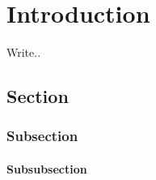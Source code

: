 \documentclass[../HWThesis.tex]{subfiles}
\begin{document}
\chapter{Introduction}
\label{ch:introduction}

Write..
\section{Section}

\cite{ghc-pps}

\subsection{Subsection}

\subsubsection{Subsubsection}
\end{document}
